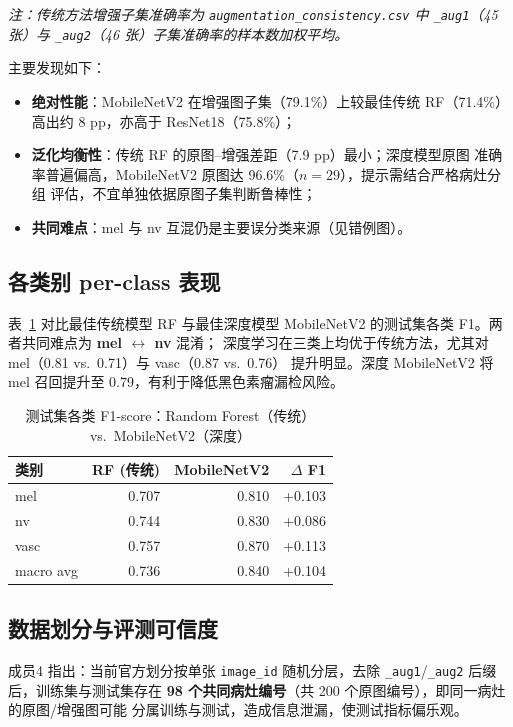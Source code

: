 \documentclass[12pt,a4paper]{ctexart}
\begin{document}
\textit{注：传统方法增强子集准确率为 \texttt{augmentation\_consistency.csv} 中
\texttt{\_aug1}（45 张）与 \texttt{\_aug2}（46 张）子集准确率的样本数加权平均。}

主要发现如下：
\begin{itemize}
  \item \textbf{绝对性能}：MobileNetV2 在增强图子集（79.1\%）上较最佳传统 RF（71.4\%）
  高出约 8 pp，亦高于 ResNet18（75.8\%）；
  \item \textbf{泛化均衡性}：传统 RF 的原图--增强差距（7.9 pp）最小；深度模型原图
  准确率普遍偏高，MobileNetV2 原图达 96.6\%（$n{=}29$），提示需结合严格病灶分组
  评估，不宜单独依据原图子集判断鲁棒性；
  \item \textbf{共同难点}：mel 与 nv 互混仍是主要误分类来源（见错例图）。
\end{itemize}

\subsection{各类别 per-class 表现}

表~\ref{tab:trad_vs_dl_class} 对比最佳传统模型 RF 与最佳深度模型 MobileNetV2
的测试集各类 F1。两者共同难点为 \textbf{mel $\leftrightarrow$ nv} 混淆；
深度学习在三类上均优于传统方法，尤其对 mel（0.81 vs.\ 0.71）与 vasc（0.87 vs.\ 0.76）
提升明显。深度 MobileNetV2 将 mel 召回提升至 0.79，有利于降低黑色素瘤漏检风险。

\begin{table}[H]
  \centering
  \caption{测试集各类 F1-score：Random Forest（传统）vs.\ MobileNetV2（深度）}
  \label{tab:trad_vs_dl_class}
  \begin{tabular}{lrrr}
    \toprule
    类别 & RF (传统) & MobileNetV2 & $\Delta$ F1 \\
    \midrule
    mel  & 0.707 & 0.810 & +0.103 \\
    nv   & 0.744 & 0.830 & +0.086 \\
    vasc & 0.757 & 0.870 & +0.113 \\
    \midrule
    macro avg & 0.736 & 0.840 & +0.104 \\
    \bottomrule
  \end{tabular}
\end{table}

\subsection{数据划分与评测可信度}

成员4 指出：当前官方划分按单张 \texttt{image\_id} 随机分层，去除
\texttt{\_aug1}/\texttt{\_aug2} 后缀后，训练集与测试集存在
\textbf{98 个共同病灶编号}（共 200 个原图编号），即同一病灶的原图/增强图可能
分属训练与测试，造成信息泄漏，使测试指标偏乐观。
\end{document}
